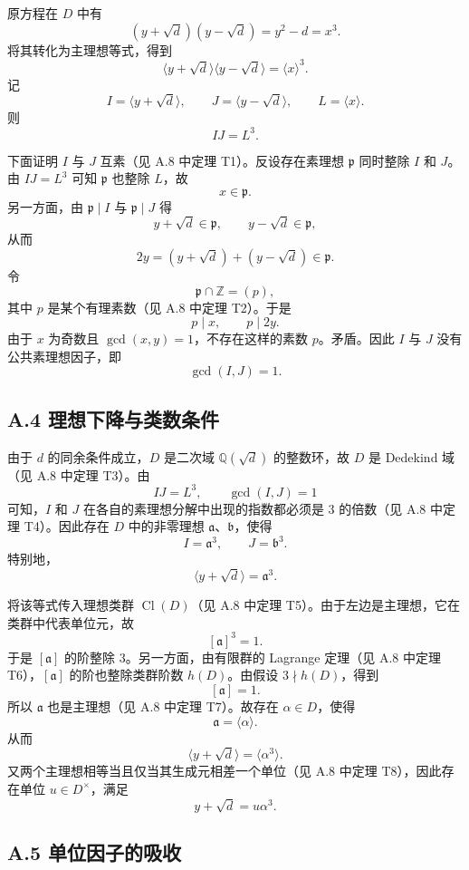原方程在 \(D\) 中有
\[
    (y+\sqrt d)(y-\sqrt d)=y^2-d=x^3.
\]
将其转化为主理想等式，得到
\[
    \langle y+\sqrt d\rangle\langle y-\sqrt d\rangle=\langle x\rangle^3.
\]
记
\[
    I=\langle y+\sqrt d\rangle,
    \qquad
    J=\langle y-\sqrt d\rangle,
    \qquad
    L=\langle x\rangle.
\]
则
\[
    IJ=L^3.
\]

下面证明 \(I\) 与 \(J\) 互素（见 A.8 中定理 T1）。反设存在素理想 \(\mathfrak p\) 同时整除 \(I\) 和 \(J\)。由 \(IJ=L^3\) 可知 \(\mathfrak p\) 也整除 \(L\)，故
\[
    x\in \mathfrak p.
\]
另一方面，由 \(\mathfrak p\mid I\) 与 \(\mathfrak p\mid J\) 得
\[
    y+\sqrt d\in \mathfrak p,
    \qquad
    y-\sqrt d\in \mathfrak p,
\]
从而
\[
    2y=(y+\sqrt d)+(y-\sqrt d)\in \mathfrak p.
\]
令
\[
    \mathfrak p\cap\mathbb Z=(p),
\]
其中 \(p\) 是某个有理素数（见 A.8 中定理 T2）。于是
\[
    p\mid x,
    \qquad
    p\mid 2y.
\]
由于 \(x\) 为奇数且 \(\gcd(x,y)=1\)，不存在这样的素数 \(p\)。矛盾。因此 \(I\) 与 \(J\) 没有公共素理想因子，即
\[
    \gcd(I,J)=1.
\]

\subsection*{A.4 理想下降与类数条件}

由于 \(d\) 的同余条件成立，\(D\) 是二次域 \(\mathbb Q(\sqrt d)\) 的整数环，故 \(D\) 是 Dedekind 域（见 A.8 中定理 T3）。由
\[
    IJ=L^3,
    \qquad
    \gcd(I,J)=1
\]
可知，\(I\) 和 \(J\) 在各自的素理想分解中出现的指数都必须是 \(3\) 的倍数（见 A.8 中定理 T4）。因此存在 \(D\) 中的非零理想 \(\mathfrak a\)、\(\mathfrak b\)，使得
\[
    I=\mathfrak a^3,
    \qquad
    J=\mathfrak b^3.
\]
特别地，
\[
    \langle y+\sqrt d\rangle=\mathfrak a^3.
\]

将该等式传入理想类群 \(\operatorname{Cl}(D)\)（见 A.8 中定理 T5）。由于左边是主理想，它在类群中代表单位元，故
\[
    [\mathfrak a]^3=1.
\]
于是 \([\mathfrak a]\) 的阶整除 \(3\)。另一方面，由有限群的 Lagrange 定理（见 A.8 中定理 T6），\([\mathfrak a]\) 的阶也整除类群阶数 \(h(D)\)。由假设 \(3\nmid h(D)\)，得到
\[
    [\mathfrak a]=1.
\]
所以 \(\mathfrak a\) 也是主理想（见 A.8 中定理 T7）。故存在 \(\alpha\in D\)，使得
\[
    \mathfrak a=\langle \alpha\rangle.
\]
从而
\[
    \langle y+\sqrt d\rangle=\langle \alpha^3\rangle.
\]
又两个主理想相等当且仅当其生成元相差一个单位（见 A.8 中定理 T8），因此存在单位 \(u\in D^\times\)，满足
\[
    y+\sqrt d=u\alpha^3.
\]

\subsection*{A.5 单位因子的吸收}

